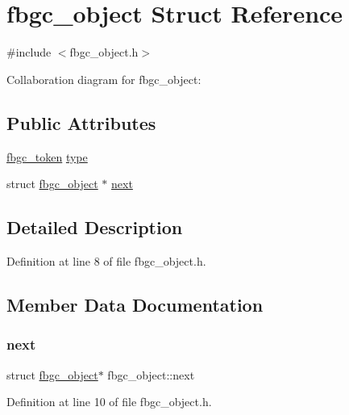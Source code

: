 \hypertarget{structfbgc__object}{}\section{fbgc\+\_\+object Struct Reference}
\label{structfbgc__object}


{\ttfamily \#include $<$fbgc\+\_\+object.\+h$>$}



Collaboration diagram for fbgc\+\_\+object\+:
\subsection*{Public Attributes}
\begin{DoxyCompactItemize}
\item 
\hyperlink{tokens_8h_a9d21ebbf42e602eb0cf502c867d20a7e}{fbgc\+\_\+token} \hyperlink{structfbgc__object_a0e0af82c82bab33be533f6ce2edddd86}{type}
\item 
struct \hyperlink{structfbgc__object}{fbgc\+\_\+object} $\ast$ \hyperlink{structfbgc__object_af60d4b0e6482124b9e045f61e7734433}{next}
\end{DoxyCompactItemize}


\subsection{Detailed Description}


Definition at line 8 of file fbgc\+\_\+object.\+h.



\subsection{Member Data Documentation}
\mbox{\label{structfbgc__object_af60d4b0e6482124b9e045f61e7734433}} 
\subsubsection{\texorpdfstring{next}{next}}
{\footnotesize\ttfamily struct \hyperlink{structfbgc__object}{fbgc\+\_\+object}$\ast$ fbgc\+\_\+object\+::next}



Definition at line 10 of file fbgc\+\_\+object.\+h.

\mbox{\label{structfbgc__object_a0e0af82c82bab33be533f6ce2edddd86}} 
